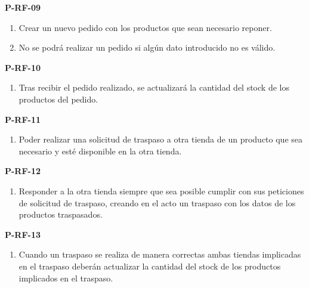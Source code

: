 \textbf{P-RF-09}
\begin{enumerate}
	\item Crear un nuevo pedido con los productos que sean necesario reponer.
	\item No se podrá realizar un pedido si algún dato introducido no es válido.
\end{enumerate}

\textbf{P-RF-10}
\begin{enumerate}
	\item Tras recibir el pedido realizado, se actualizará la cantidad del stock de los productos del pedido.
\end{enumerate}

\textbf{P-RF-11}
\begin{enumerate}
	\item Poder realizar una solicitud de traspaso a otra tienda de un producto que sea necesario y esté disponible en la otra tienda.
\end{enumerate}

\textbf{P-RF-12}
\begin{enumerate}
	\item Responder a la otra tienda siempre que sea posible cumplir con sus peticiones de solicitud de traspaso, creando en el acto un traspaso con los datos de los productos traspasados.
\end{enumerate}

\textbf{P-RF-13}
\begin{enumerate}
	\item Cuando un traspaso se realiza de manera correctas ambas tiendas implicadas en el traspaso deberán actualizar la cantidad del stock de los productos implicados en el traspaso.
\end{enumerate}

